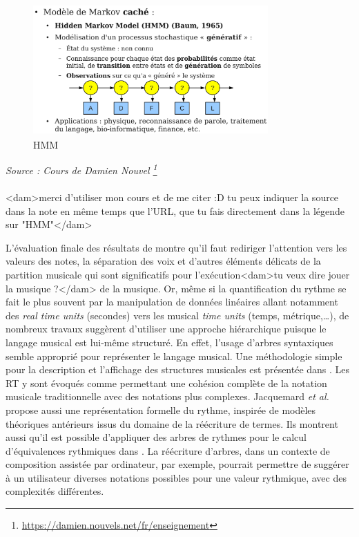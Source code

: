 \begin{figure}[h]
	\centering
	\includegraphics[height=50mm, width=90mm]{z_images/2_etat_de_l_art/0_hmm.png}
	\caption{HMM}
\end{figure}
\textit{Source : Cours de Damien Nouvel
\footnote{\url{https://damien.nouvels.net/fr/enseignement}}}\\\\
<dam>merci d'utiliser mon cours et de me citer :D
tu peux indiquer la source dans la note en même temps que l'URL, que tu fais
directement dans la légende sur "HMM"</dam>

L’évaluation finale des résultats de \cite{SHIBATA2021262} montre qu’il faut
rediriger l’attention vers les valeurs des notes, la séparation des voix et
d'autres éléments délicats de la partition musicale qui sont significatifs pour
l'exécution<dam>tu veux dire jouer la musique ?</dam> de la musique. 
Or, même si la quantification du rythme se fait le plus souvent par la
manipulation de données linéaires allant notamment des \textit{real time units}
(secondes) vers les musical \textit{time units} (temps, métrique,…), de
nombreux travaux suggèrent d’utiliser une approche hiérarchique puisque le
langage musical est lui-même structuré.
%
%
En effet, l’usage d’arbres syntaxiques semble approprié pour représenter le
langage musical. Une méthodologie simple pour la description et l'affichage des
structures musicales est présentée dans \cite{rythm_tree}. 
Les RT  y sont évoqués comme permettant une cohésion complète de
la notation musicale traditionnelle avec des notations plus complexes.
Jacquemard \textit{et al.} \cite{jacquemard:hal-01134096} propose aussi une
représentation formelle du rythme, inspirée de modèles théoriques antérieurs
issus du domaine de la réécriture de termes. 
 Ils montrent aussi qu'il est possible d'appliquer des arbres de
rythmes pour le calcul d'équivalences rythmiques dans
\cite{jacquemard:hal-01403982}. La réécriture d’arbres, dans un contexte de
composition assistée par ordinateur, par exemple, pourrait permettre de
suggérer à un utilisateur diverses notations possibles pour une valeur
rythmique, avec des complexités différentes.

